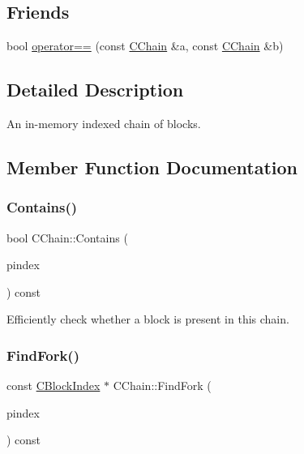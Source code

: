 \subsection*{Friends}
\begin{DoxyCompactItemize}
\item 
bool \mbox{\hyperlink{class_c_chain_a0e46ed4192afeafb8d420b2d6d9bb24c}{operator==}} (const \mbox{\hyperlink{class_c_chain}{C\+Chain}} \&a, const \mbox{\hyperlink{class_c_chain}{C\+Chain}} \&b)
\end{DoxyCompactItemize}


\subsection{Detailed Description}
An in-\/memory indexed chain of blocks. 

\subsection{Member Function Documentation}
\mbox{\label{class_c_chain_af1786dc229c215dea7f727c11df2c8dc}} 
\subsubsection{\texorpdfstring{Contains()}{Contains()}}
{\footnotesize\ttfamily bool C\+Chain\+::\+Contains (\begin{DoxyParamCaption}\item[{const \mbox{\hyperlink{class_c_block_index}{C\+Block\+Index}} $\ast$}]{pindex }\end{DoxyParamCaption}) const\hspace{0.3cm}{\ttfamily [inline]}}

Efficiently check whether a block is present in this chain. \mbox{\label{class_c_chain_adb9ec01329511e869bba95e3c143da71}} 
\subsubsection{\texorpdfstring{FindFork()}{FindFork()}}
{\footnotesize\ttfamily const \mbox{\hyperlink{class_c_block_index}{C\+Block\+Index}} $\ast$ C\+Chain\+::\+Find\+Fork (\begin{DoxyParamCaption}\item[{const \mbox{\hyperlink{class_c_block_index}{C\+Block\+Index}} $\ast$}]{pindex }\end{DoxyParamCaption}) const}

